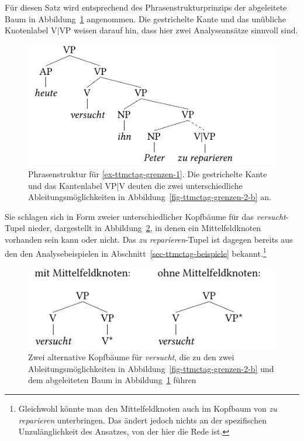 Für diesen Satz wird entsprechend des Phrasenstrukturprinzips der abgeleitete Baum in Abbildung~\ref{fig-ttmctag-grenzen-1} angenommen. Die gestrichelte Kante und das unübliche Knotenlabel V$|$VP weisen darauf hin, dass hier zwei Analyseansätze sinnvoll sind. 
\begin{figure}[t]
\centering
\includegraphics{graphics/abb727.pdf}
\caption{\label{fig-ttmctag-grenzen-1}Phrasenstruktur für \ref{ex-ttmctag-grenzen-1}. Die gestrichelte Kante und das Kantenlabel VP|V deuten die zwei unterschiedliche Ableitungsmöglichkeiten in Abbildung~\ref{fig-ttmctag-grenzen-2-b} an.}
\end{figure} 
Sie schlagen sich in Form zweier unterschiedlicher Kopfbäume für das {\it versucht}-Tupel nieder, dargestellt in Abbildung~\ref{fig-ttmctag-grenzen-2}, in denen ein Mittelfeldknoten vorhanden sein kann oder nicht. Das {\it zu reparieren}-Tupel ist dagegen bereits aus den den Analysebeispielen in Abschnitt~\ref{sec-ttmctag-beispiele} bekannt.\footnote{Gleichwohl könnte man den Mittelfeldknoten auch im Kopfbaum von {\it zu reparieren} unterbringen. Das ändert jedoch nichts an der spezifischen Unzulänglichkeit des Ansatzes, von der hier die Rede ist.}     
\begin{figure}[t]
\centering
\includegraphics{graphics/abb728.pdf}
\caption{\label{fig-ttmctag-grenzen-2}Zwei alternative Kopfbäume für {\it versucht}, die zu den zwei Ableitungsmöglichkeiten in Abbildung~\ref{fig-ttmctag-grenzen-2-b} und dem abgeleiteten Baum in Abbildung~\ref{fig-ttmctag-grenzen-1} führen}
\end{figure} 
